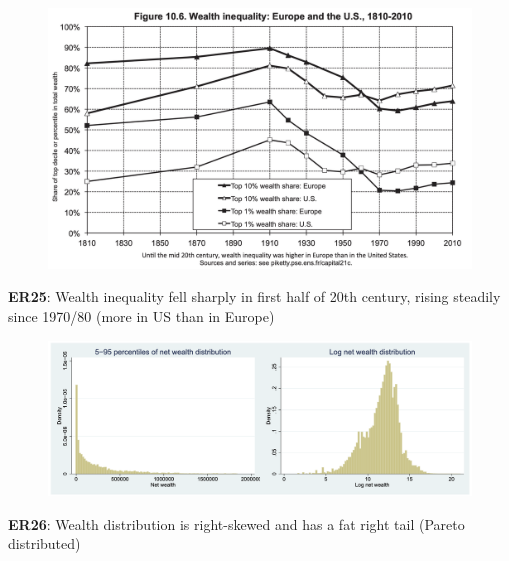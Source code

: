 \documentclass[11pt, aspectratio=169]{beamer}
\begin{document}
\begin{frame}{}
	\begin{figure}
		\includegraphics[scale=0.3]{./figures/inequality_wealth_1}
	\end{figure}

	\vspace{0mm}
	{\color{blue}\textbf{ER25}}: Wealth inequality fell sharply in first half of 20th century, rising steadily since 1970/80 (more in US than in Europe)
\end{frame}


\begin{frame}{}
	\begin{figure}
		\includegraphics[scale=0.35]{./figures/inequality_wealth_2}
	\end{figure}

	\vspace{2mm}
	{\color{blue}\textbf{ER26}}: Wealth distribution is right-skewed and has a fat right tail (Pareto distributed)
\end{frame}
\end{document}
